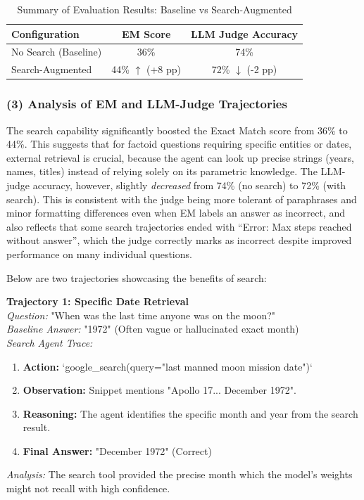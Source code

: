 \documentclass{article}
\begin{document}
\begin{table}[H]
\centering
\caption{Summary of Evaluation Results: Baseline vs Search-Augmented}
\label{tab:main_results}
\begin{tabular}{lcc}
\toprule
\textbf{Configuration} & \textbf{EM Score} & \textbf{LLM Judge Accuracy} \\
\midrule
No Search (Baseline) & 36\% & 74\% \\
Search-Augmented & 44\% $\uparrow$ (+8 pp) & 72\% $\downarrow$ (-2 pp) \\
\bottomrule
\end{tabular}
\end{table}

\subsubsection{(3) Analysis of EM and LLM-Judge Trajectories}

The search capability significantly boosted the Exact Match score from 36\% to 44\%. This suggests that for factoid questions requiring specific entities or dates, external retrieval is crucial, because the agent can look up precise strings (years, names, titles) instead of relying solely on its parametric knowledge. The LLM-judge accuracy, however, slightly \emph{decreased} from 74\% (no search) to 72\% (with search). This is consistent with the judge being more tolerant of paraphrases and minor formatting differences even when EM labels an answer as incorrect, and also reflects that some search trajectories ended with ``Error: Max steps reached without answer'', which the judge correctly marks as incorrect despite improved performance on many individual questions.

Below are two trajectories showcasing the benefits of search:

\textbf{Trajectory 1: Specific Date Retrieval} \\
\textit{Question:} "When was the last time anyone was on the moon?" \\
\textit{Baseline Answer:} "1972" (Often vague or hallucinated exact month) \\
\textit{Search Agent Trace:}
\begin{enumerate}
    \item \textbf{Action:} `google\_search(query="last manned moon mission date")`
    \item \textbf{Observation:} Snippet mentions "Apollo 17... December 1972".
    \item \textbf{Reasoning:} The agent identifies the specific month and year from the search result.
    \item \textbf{Final Answer:} "December 1972" (Correct)
\end{enumerate}
\textit{Analysis:} The search tool provided the precise month which the model's weights might not recall with high confidence.
\end{document}
